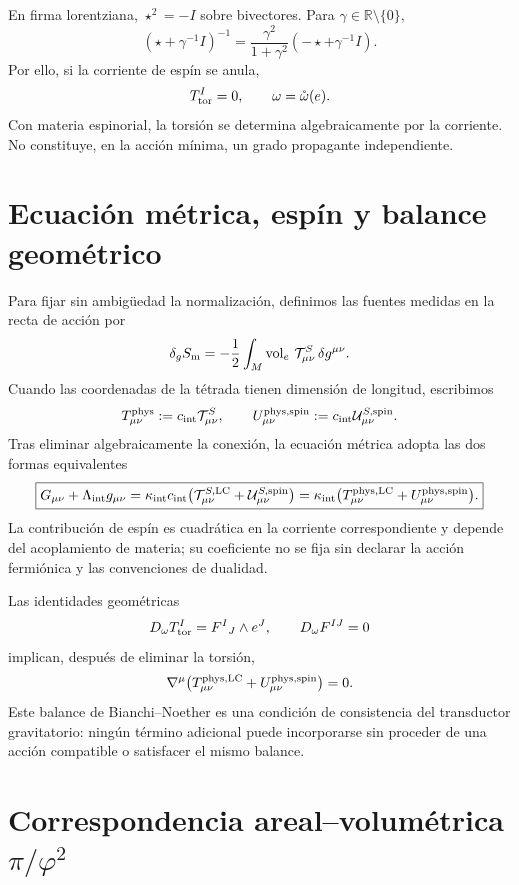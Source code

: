 En firma lorentziana, \(\star^2=-I\) sobre bivectores.  Para
\(\gamma\in\mathbb R\setminus\{0\}\),
\[
 (\star+\gamma^{-1}I)^{-1}
 =\frac{\gamma^2}{1+\gamma^2}
  (-\star+\gamma^{-1}I).
\]
Por ello, si la corriente de espín se anula,
\[
 T_{\rm tor}^I=0,\qquad
 \omega=\mathring\omega(e).
\]
Con materia espinorial, la torsión se determina algebraicamente por la
corriente.  No constituye, en la acción mínima, un grado propagante
independiente.

\section{Ecuación métrica, espín y balance geométrico}

Para fijar sin ambigüedad la normalización, definimos las fuentes medidas en
la recta de acción por
\[
 \delta_g S_{\rm m}
 =-\frac12\int_M\operatorname{vol}_e\,
 \mathcal T^{S}_{\mu\nu}\,\delta g^{\mu\nu}.
\]
Cuando las coordenadas de la tétrada tienen dimensión de longitud, escribimos
\[
 T^{\rm phys}_{\mu\nu}:=c_{\rm int}\mathcal T^{S}_{\mu\nu},
 \qquad
 U^{\rm phys,spin}_{\mu\nu}
 :=c_{\rm int}\mathcal U^{S,\rm spin}_{\mu\nu}.
\]
Tras eliminar algebraicamente la conexión, la ecuación métrica adopta las
dos formas equivalentes
\[
 \boxed{
 G_{\mu\nu}+\Lambda_{\rm int}g_{\mu\nu}
 =\kappa_{\rm int}c_{\rm int}
 \bigl(\mathcal T_{\mu\nu}^{S,\rm LC}
       +\mathcal U_{\mu\nu}^{S,\rm spin}\bigr)
 =\kappa_{\rm int}
 \bigl(T_{\mu\nu}^{\rm phys,LC}
       +U_{\mu\nu}^{\rm phys,spin}\bigr).}
\]
La contribución de espín es cuadrática en la corriente correspondiente y
depende del acoplamiento de materia; su coeficiente no se fija sin declarar
la acción fermiónica y las convenciones de dualidad.

Las identidades geométricas
\[
 D_\omega T_{\rm tor}^{I}=F^{I}{}_{J}\wedge e^{J},
 \qquad
 D_\omega F^{IJ}=0
\]
implican, después de eliminar la torsión,
\[
 \nabla^\mu\bigl(T_{\mu\nu}^{\rm phys,LC}
             +U_{\mu\nu}^{\rm phys,spin}\bigr)=0.
\]
Este balance de Bianchi--Noether es una condición de consistencia del
transductor gravitatorio: ningún término adicional puede incorporarse sin
proceder de una acción compatible o satisfacer el mismo balance.

\section{Correspondencia areal–volumétrica \(\pi/\varphi^2\)}

